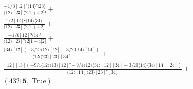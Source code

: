 \documentclass[varwidth, border=5pt]{standalone}
\begin{document}
\begin{my}
$\begin{gathered}
\scriptscriptstyle\frac{-1/3[12]³⟨14⟩²⟨23⟩}{⟨12⟩[23]⟨2|1+4|2]²} +\\
\scriptscriptstyle\frac{1/2[12]²⟨14⟩⟨34⟩}{⟨12⟩[23]⟨2|1+4|2]} +\\
\scriptscriptstyle\frac{-1/6[12]³⟨14⟩²}{⟨12⟩[23]²⟨2|1+4|2]} +\\
\scriptscriptstyle\frac{⟨34⟩[12](-3/20⟨12⟩[12]-3/20⟨14⟩[14])}{⟨12⟩⟨23⟩[23][34]} +\\
\scriptscriptstyle\frac{[12][13](-9/4⟨12⟩⟨13⟩[12]²-9/4⟨12⟩⟨34⟩[12][24]+3/20⟨14⟩⟨34⟩[14][24])}{⟨12⟩[14]⟨23⟩[23]²[34]} +\\
\scriptscriptstyle(4321𝟓,\;\text{True}) \phantom{+}
\end{gathered}$
\end{my}
\end{document}
